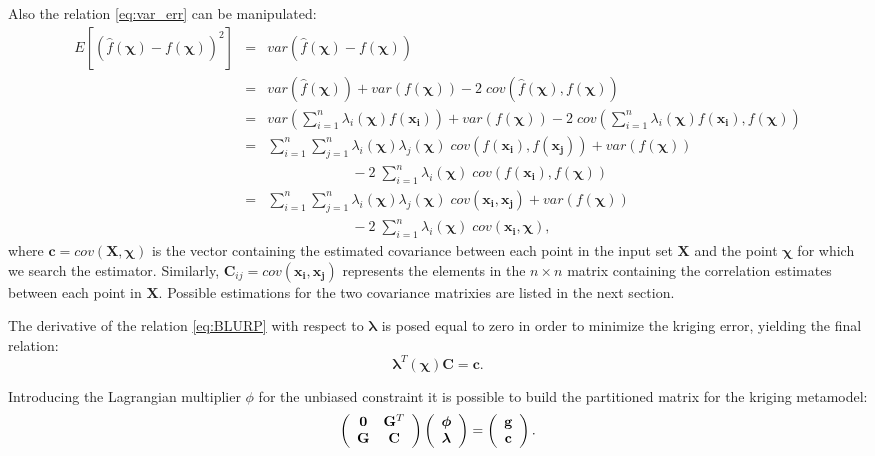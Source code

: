 Also the relation \eqref{eq:var_err} can be manipulated:
\begin{eqnarray}
E \left[\left( \hat{f}(\boldsymbol{\chi})  -f(\boldsymbol{\chi}) \right)^2\right] &=& var(  \hat{f}(\boldsymbol{\chi})  -f(\boldsymbol{\chi}) ) \nonumber \\
&=& var(\hat{f}(\boldsymbol{\chi}))  +var(f(\boldsymbol{\chi})) -2 \; cov( \hat{f}(\boldsymbol{\chi}),f(\boldsymbol{\chi})) \nonumber \\
&=& var( \sum_{i=1}^{n}\lambda_i(\boldsymbol{\chi}) f(\mathbf{x_i}) )  +var(f(\boldsymbol{\chi})) -2 \; cov( \sum_{i=1}^{n}\lambda_i(\boldsymbol{\chi}) f(\mathbf{x_i}),f(\boldsymbol{\chi})) \nonumber \\
&=&  \sum_{i=1}^{n} \sum_{j=1}^{n} \lambda_i(\boldsymbol{\chi})\lambda_j(\boldsymbol{\chi}) \; cov(f(\mathbf{x_i}),   f(\mathbf{x_j})) +var(f(\boldsymbol{\chi})) \nonumber \\
&& \qquad \qquad \qquad -2 \;  \sum_{i=1}^{n}\lambda_i(\boldsymbol{\chi}) \; cov(f(\mathbf{x_i}),f(\boldsymbol{\chi})) \nonumber \\
&=& \sum_{i=1}^{n} \sum_{j=1}^{n} \lambda_i(\boldsymbol{\chi})\lambda_j(\boldsymbol{\chi}) \; cov(\mathbf{x_i}, \mathbf{x_j}) +var(f(\boldsymbol{\chi})) \nonumber \\
&& \qquad \qquad \qquad -2 \;  \sum_{i=1}^{n}\lambda_i(\boldsymbol{\chi}) \; cov(\mathbf{x_i},\boldsymbol{\chi}),
\label{eq:BLURP}
\end{eqnarray}
where $\mathbf{c} = cov(\mathbf{X},\boldsymbol{\chi})$ is the vector containing the estimated covariance between each point in the input set $\mathbf{X}$ and the point $\boldsymbol{\chi}$ for which we search the estimator. Similarly, $\mathbf{C}_{ij} =  cov(\mathbf{x_i}, \mathbf{x_j})$ represents the elements in the $n \times n$ matrix containing the correlation estimates between each point in $\mathbf{X}$. Possible estimations for the two covariance matrixies are listed in the next section.

The derivative of the relation \eqref{eq:BLURP} with respect to $\boldsymbol{ \lambda}$ is posed equal to zero in order to minimize the kriging error, yielding the final relation:
\begin{equation}
\boldsymbol{\lambda}^T(\boldsymbol{\chi}) \mathbf{C} = \mathbf{c}.
\end{equation}

Introducing the Lagrangian multiplier $\phi$ for the unbiased constraint it is possible to build the partitioned matrix for the kriging metamodel:
\begin{equation}
\left(
\begin{array}{c c}
\mathbf{0} & \mathbf{G}^T \\
\mathbf{G} & \mathbf{C}
\end{array}
\right)  \left( 
\begin{array}{c}
\boldsymbol{\phi} \\
\boldsymbol{\lambda}
\end{array}
\right) = \left( 
\begin{array}{c}
\mathbf{g} \\
\mathbf{c}
\end{array}
\right).
\end{equation}

